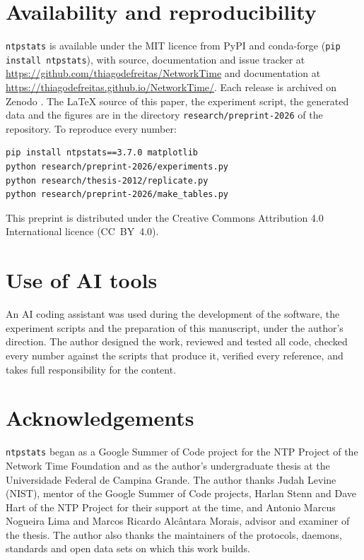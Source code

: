 \documentclass[11pt,a4paper]{article}
\newcommand{\ntp}{\texttt{ntpstats}}
\begin{document}
\section{Availability and reproducibility}\label{sec:availability}

\ntp{} is available under the MIT licence from PyPI and conda-forge (\texttt{pip install ntpstats}), with source, documentation and issue tracker at
\url{https://github.com/thiagodefreitas/NetworkTime} and documentation at
\url{https://thiagodefreitas.github.io/NetworkTime/}. Each release is archived on Zenodo
\citep{ntpstats}. The \LaTeX{} source of this paper, the experiment script, the generated data and the
figures are in the directory \texttt{research/preprint-2026} of the repository. To reproduce every number:
\begin{verbatim}
pip install ntpstats==3.7.0 matplotlib
python research/preprint-2026/experiments.py
python research/thesis-2012/replicate.py
python research/preprint-2026/make_tables.py
\end{verbatim}

This preprint is distributed under the Creative Commons Attribution 4.0 International licence
(CC~BY~4.0).

\section*{Use of AI tools}

An AI coding assistant was used during the development of the software, the experiment scripts and
the preparation of this manuscript, under the author's direction. The author designed the work,
reviewed and tested all code, checked every number against the scripts that produce it, verified
every reference, and takes full responsibility for the content.

\section*{Acknowledgements}

\ntp{} began as a Google Summer of Code project for the NTP Project of the Network Time Foundation and
as the author's undergraduate thesis at the Universidade Federal de Campina Grande. The author thanks
Judah Levine (NIST), mentor of the Google Summer of Code projects, Harlan Stenn and Dave Hart of the
NTP Project for their support at the time, and Antonio Marcus Nogueira Lima and Marcos Ricardo
Alc\^antara Morais, advisor and examiner of the thesis. The author also thanks the maintainers of the protocols, daemons, standards and open data sets
on which this work builds.



\end{document}
